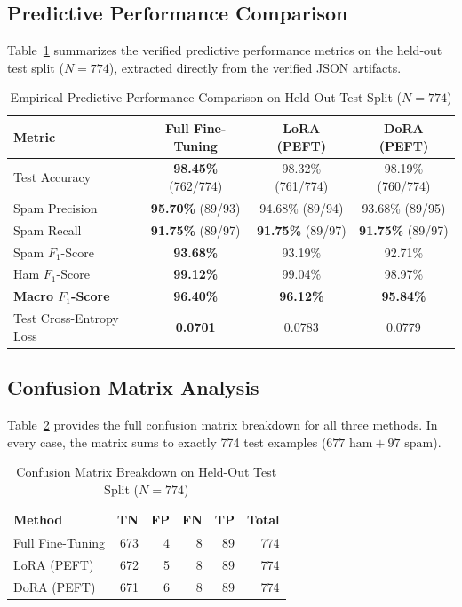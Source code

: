 \documentclass[conference]{IEEEtran}
\begin{document}
\subsection{Predictive Performance Comparison}
Table~\ref{tab:results_performance} summarizes the verified predictive performance metrics on the held-out test split ($N=774$), extracted directly from the verified JSON artifacts.

\begin{table}[htbp]
\caption{Empirical Predictive Performance Comparison on Held-Out Test Split ($N=774$)}
\label{tab:results_performance}
\centering
\begin{tabular}{lccc}
\toprule
\textbf{Metric} & \textbf{Full Fine-Tuning} & \textbf{LoRA (PEFT)} & \textbf{DoRA (PEFT)} \\
\midrule
Test Accuracy & \textbf{98.45\%} (762/774) & 98.32\% (761/774) & 98.19\% (760/774) \\
Spam Precision & \textbf{95.70\%} (89/93) & 94.68\% (89/94) & 93.68\% (89/95) \\
Spam Recall & \textbf{91.75\%} (89/97) & \textbf{91.75\%} (89/97) & \textbf{91.75\%} (89/97) \\
Spam $F_1$-Score & \textbf{93.68\%} & 93.19\% & 92.71\% \\
Ham $F_1$-Score & \textbf{99.12\%} & 99.04\% & 98.97\% \\
\textbf{Macro $F_1$-Score} & \textbf{96.40\%} & \textbf{96.12\%} & \textbf{95.84\%} \\
Test Cross-Entropy Loss & \textbf{0.0701} & 0.0783 & 0.0779 \\
\bottomrule
\end{tabular}
\end{table}

\subsection{Confusion Matrix Analysis}
Table~\ref{tab:confusion_matrices} provides the full confusion matrix breakdown for all three methods. In every case, the matrix sums to exactly 774 test examples ($677 \text{ ham} + 97 \text{ spam}$).

\begin{table}[htbp]
\caption{Confusion Matrix Breakdown on Held-Out Test Split ($N=774$)}
\label{tab:confusion_matrices}
\centering
\begin{tabular}{lrrrrr}
\toprule
\textbf{Method} & \textbf{TN} & \textbf{FP} & \textbf{FN} & \textbf{TP} & \textbf{Total} \\
\midrule
Full Fine-Tuning & 673 & 4 & 8 & 89 & 774 \\
LoRA (PEFT) & 672 & 5 & 8 & 89 & 774 \\
DoRA (PEFT) & 671 & 6 & 8 & 89 & 774 \\
\bottomrule
\end{tabular}
\end{table}
\end{document}
